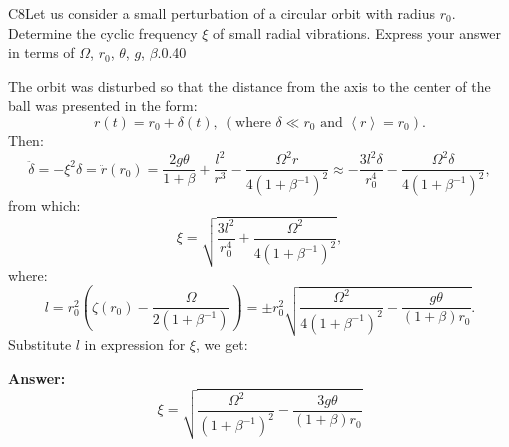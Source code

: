 \documentclass[11pt,a4paper]{article}
\begin{document}
\begin{solcard}{C8}{Let us consider a small perturbation of a circular orbit with radius $r_0$. Determine the cyclic frequency $\xi$ of small radial vibrations. Express your answer in terms of $\Omega$, $r_0$, $\theta$, $g$, $\beta$.}{0.40}

The orbit was disturbed so that the distance from the axis to the center of the ball was presented in the form: $$ r(t) = r_0 + \delta (t), ~(\text{where } \delta \ll r_0 \text{ and } \left< r \right> = r_0). $$Then: $$ \ddot \delta = - \xi^2 \delta = \ddot r(r_0) = \frac{2g\theta}{1 + \beta} + \frac{l^2}{r^3} - \frac{\Omega^2 r}{4 (1 + \beta^{-1})^2} \approx - \frac{3 l^2 \delta}{r_0^4} - \frac{\Omega^2 \delta}{4 (1 + \beta^{-1})^2}, $$from which: $$ \xi = \sqrt{\frac{3 l^2}{r_0^4} + \frac{\Omega^2}{4 (1 + \beta^{-1})^2}}, $$where: $$ l = r_0^2 \left(\zeta (r_0) - \frac{\Omega}{2 (1 + \beta^{-1})} \right) = \pm r_0^2 \sqrt{\frac{\Omega^2}{4 (1 + \beta^{-1})^2} - \frac{g \theta}{(1 + \beta) r_0}}. $$Substitute $l$ in expression for $\xi$, we get:

\par\smallskip\noindent\textbf{Answer:} $$ \xi = \sqrt{\frac{\Omega^2}{(1 + \beta^{-1})^2} - \frac{3 g \theta}{(1 + \beta) r_0}} $$
\end{solcard}
\end{document}
